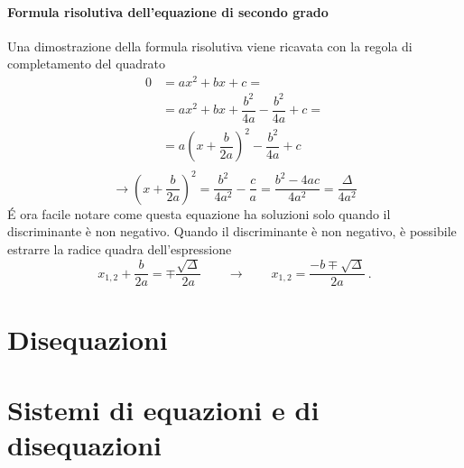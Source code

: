 \subsubsection{Formula risolutiva dell'equazione di secondo grado}
Una dimostrazione della formula risolutiva viene ricavata con la regola di completamento del quadrato
\begin{equation}
    \begin{aligned}
        0 & = a x^2 + b x + c = \\
          & = a x^2 + b x + \dfrac{b^2}{4a} - \dfrac{b^2}{4a} + c = \\
          & = a \left(x + \dfrac{b}{2a} \right)^2 - \dfrac{b^2}{4a} + c \\
    \end{aligned}
\end{equation}
\begin{equation}
    \rightarrow \left( x + \dfrac{b}{2a} \right)^2 = \dfrac{b^2}{4 a^2} - \dfrac{c}{a} = \dfrac{b^2 - 4 a c}{4a^2} = \dfrac{\Delta}{4a^2}
\end{equation}
\'E ora facile notare come questa equazione ha soluzioni solo quando il discriminante è non negativo. Quando il discriminante è non negativo, è possibile estrarre la radice quadra dell'espressione
\begin{equation}
    x_{1,2} + \dfrac{b}{2a} = \mp \dfrac{\sqrt{\Delta}}{2a} \qquad \rightarrow \qquad 
    x_{1,2} = \dfrac{-b  \mp \sqrt{\Delta}}{2a} \ . 
\end{equation}


\chapter{Disequazioni}


\chapter{Sistemi di equazioni e di disequazioni}


